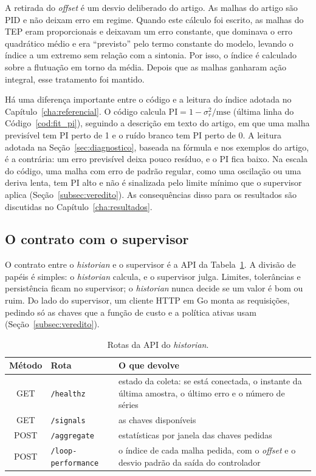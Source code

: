 A retirada do \textit{offset} é um desvio deliberado do artigo. As malhas do artigo são PID e não deixam erro em regime. Quando este cálculo foi escrito, as malhas do TEP eram proporcionais e deixavam um erro constante, que dominava o erro quadrático médio e era ``previsto'' pelo termo constante do modelo, levando o índice a um extremo sem relação com a sintonia. Por isso, o índice é calculado sobre a flutuação em torno da média. Depois que as malhas ganharam ação integral, esse tratamento foi mantido.

Há uma diferença importante entre o código e a leitura do índice adotada no Capítulo~\ref{cha:referencial}. O código calcula $\mathrm{PI} = 1 - \sigma^2_r/\mathrm{mse}$ (última linha do Código~\ref{cod:fit_pi}), seguindo a descrição em texto do artigo, em que uma malha previsível tem PI perto de 1 e o ruído branco tem PI perto de 0. A leitura adotada na Seção~\ref{sec:diagnostico}, baseada na fórmula e nos exemplos do artigo, é a contrária: um erro previsível deixa pouco resíduo, e o PI fica baixo. Na escala do código, uma malha com erro de padrão regular, como uma oscilação ou uma deriva lenta, tem PI alto e não é sinalizada pelo limite mínimo que o supervisor aplica (Seção~\ref{subsec:veredito}). As consequências disso para os resultados são discutidas no Capítulo~\ref{cha:resultados}.

\subsection{O contrato com o supervisor}
\label{subsec:contrato_historian}

O contrato entre o \textit{historian} e o supervisor é a API da Tabela~\ref{tab:api_historian}. A divisão de papéis é simples: o \textit{historian} calcula, e o supervisor julga. Limites, tolerâncias e persistência ficam no supervisor; o \textit{historian} nunca decide se um valor é bom ou ruim. Do lado do supervisor, um cliente HTTP em Go monta as requisições, pedindo só as chaves que a função de custo e a política ativas usam (Seção~\ref{subsec:veredito}).

\begin{table}[htbp]
	\centering
	\caption{Rotas da API do \textit{historian}.}
	\label{tab:api_historian}
	\footnotesize
	\begin{tabular}{|c|l|p{}|}
		\hline
		\textbf{Método} & \textbf{Rota} & \textbf{O que devolve} \\
		\hline
		GET & \texttt{/healthz} & estado da coleta: se está conectada, o instante da última amostra, o último erro e o número de séries \\
		GET & \texttt{/signals} & as chaves disponíveis \\
		POST & \texttt{/aggregate} & estatísticas por janela das chaves pedidas \\
		POST & \texttt{/loop-performance} & o índice de cada malha pedida, com o \textit{offset} e o desvio padrão da saída do controlador \\
		\hline
	\end{tabular}
\end{table}

